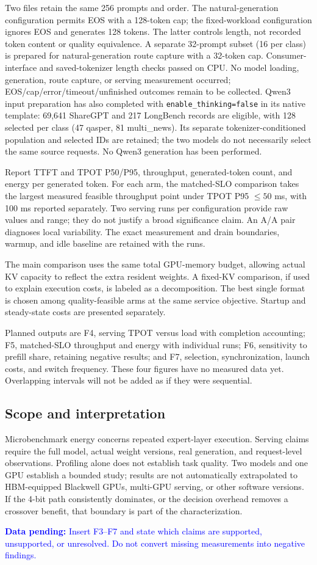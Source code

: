 \documentclass[10pt,twocolumn]{article}
\newcommand{\todo}[1]{\par\noindent\textcolor{blue}{\textbf{Data pending:} #1}\par}
\begin{document}
Two files retain the same 256 prompts and order. The natural-generation
configuration permits EOS with a 128-token cap; the fixed-workload
configuration ignores EOS and generates 128 tokens. The latter controls
length, not recorded token content or quality equivalence. A separate
32-prompt subset (16 per class) is prepared for natural-generation route
capture with a 32-token cap. Consumer-interface and saved-tokenizer length
checks passed on CPU. No model loading, generation, route capture, or
serving measurement occurred; EOS/cap/error/timeout/unfinished outcomes
remain to be collected. Qwen3 input preparation has also completed with
\texttt{enable\_thinking=false} in its native template: 69,641 ShareGPT and
217 LongBench records are eligible, with 128 selected per class
(47 qasper, 81 multi\_news). Its separate tokenizer-conditioned population
and selected IDs are retained; the two models do not necessarily select
the same source requests. No Qwen3 generation has been performed.

Report TTFT and TPOT P50/P95, throughput, generated-token count, and energy
per generated token. For each arm, the matched-SLO comparison takes the
largest measured feasible throughput point under TPOT P95 $\leq50$ ms,
with 100 ms reported separately. Two serving runs per configuration provide
raw values and range; they do not justify a broad significance claim.
An A/A pair diagnoses local variability. The exact measurement and drain
boundaries, warmup, and idle baseline are retained with the runs.

The main comparison uses the same total GPU-memory budget, allowing actual
KV capacity to reflect the extra resident weights. A fixed-KV comparison,
if used to explain execution costs, is labeled as a decomposition. The best
single format is chosen among quality-feasible arms at the same service
objective. Startup and steady-state costs are presented separately.

Planned outputs are F4, serving TPOT versus load with completion accounting;
F5, matched-SLO throughput and energy with individual runs; F6, sensitivity
to prefill share, retaining negative results; and F7, selection,
synchronization, launch costs, and switch frequency. These four figures have
no measured data yet. Overlapping intervals will not be added as if they
were sequential.

\subsection{Scope and interpretation}
Microbenchmark energy concerns repeated expert-layer execution. Serving
claims require the full model, actual weight versions, real generation,
and request-level observations. Profiling alone does not establish task
quality. Two models and one GPU establish a bounded study; results are not
automatically extrapolated to HBM-equipped Blackwell GPUs, multi-GPU serving,
or other software versions. If the 4-bit path consistently dominates, or
the decision overhead removes a crossover benefit, that boundary is part
of the characterization.
\todo{Insert F3--F7 and state which claims are supported, unsupported,
or unresolved. Do not convert missing measurements into negative findings.}
\end{document}
